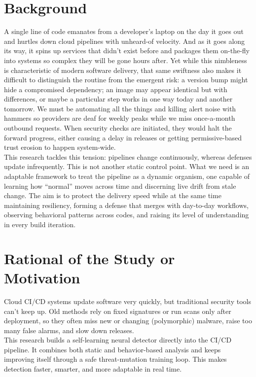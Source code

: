 \section{Background}
A single line of code emanates from a developer's laptop on the day it goes out and hurtles down cloud pipelines with unheard-of velocity. And as it goes along its way, it spins up services that didn't exist before and packages them on-the-fly into systems so complex they will be gone hours after. Yet while this nimbleness is characteristic of modern software delivery, that same swiftness also makes it difficult to distinguish the routine from the emergent risk: a version bump might hide a compromised dependency; an image may appear identical but with differences, or maybe a particular step works in one way today and another tomorrow. We must be automating all the things and killing alert noise with hammers so providers are deaf for weekly peaks while we miss once-a-month outbound requests. When security checks are initiated, they would halt the forward progress, either causing a delay in releases or getting permissive-based trust erosion to happen system-wide.\\

This research tackles this tension: pipelines change continuously, whereas defenses update infrequently. This is not another static control point. What we need is an adaptable framework to treat the pipeline as a dynamic organism, one capable of learning how “normal” moves across time and discerning live drift from stale change. The aim is to protect the delivery speed while at the same time maintaining resiliency, forming a defense that merges with day-to-day workflows, observing behavioral patterns across codes, and raising its level of understanding in every build iteration.


\section{Rational of the Study or Motivation}
Cloud CI/CD systems update software very quickly, but traditional security tools can’t keep up. Old methods rely on fixed signatures or run scans only after deployment, so they often miss new or changing (polymorphic) malware, raise too many false alarms, and slow down releases.\\

This research builds a self-learning neural detector directly into the CI/CD pipeline. It combines both static and behavior-based analysis and keeps improving itself through a safe threat-mutation training loop. This makes detection faster, smarter, and more adaptable in real time.\\

